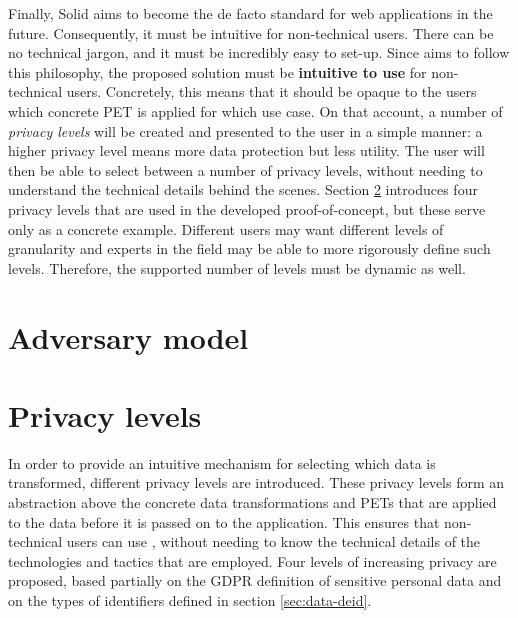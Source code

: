 Finally, Solid aims to become the de facto standard for web applications in the future. Consequently, it must be intuitive for non-technical users. There can be no technical jargon, and it must be incredibly easy to set-up. Since \middleware{} aims to follow this philosophy, the proposed solution must be \textbf{intuitive to use} for non-technical users. Concretely, this means that it should be opaque to the users which concrete PET is applied for which use case. On that account, a number of \textit{privacy levels} will be created and presented to the user in a simple manner: a higher privacy level means more data protection but less utility. The user will then be able to select between a number of privacy levels, without needing to understand the technical details behind the scenes. Section \ref{sec:privacylevels} introduces four privacy levels that are used in the developed proof-of-concept, but these serve only as a concrete example. Different users may want different levels of granularity and experts in the field may be able to more rigorously define such levels. Therefore, the supported number of levels must be dynamic as well.

\section{Adversary model}

\section{Privacy levels}
\label{sec:privacylevels}
In order to provide an intuitive mechanism for selecting which data is transformed, different privacy levels are introduced. These privacy levels form an abstraction above the concrete data transformations and \gls{PETs} that are applied to the data before it is passed on to the application. This ensures that non-technical users can use \middleware{}, without needing to know the technical details of the technologies and tactics that are employed. Four levels of increasing privacy are proposed, based partially on the \gls{GDPR} definition of sensitive personal data and on the types of identifiers defined in section \ref{sec:data-deid}.\\

